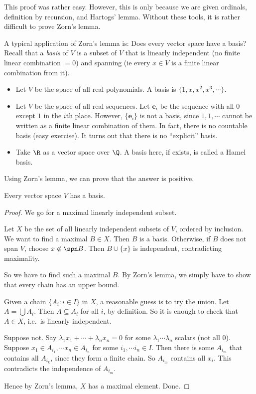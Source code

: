 \documentclass[a4paper]{article}
\begin{document}
This proof was rather easy. However, this is only because we are given ordinals, definition by recursion, and Hartogs' lemma. Without these tools, it is rather difficult to prove Zorn's lemma.

A typical application of Zorn's lemma is: Does every vector space have a basis? Recall that a \emph{basis} of $V$ is a subset of $V$ that is linearly independent (no finite linear combination $= 0$) and spanning (ie every $x\in V$ is a finite linear combination from it).

\begin{eg}\leavevmode
  \begin{itemize}
    \item Let $V$ be the space of all real polynomials. A basis is $\{1, x, x^2, x^3, \cdots\}$.
    \item Let $V$ be the space of all real sequences. Let $\mathbf{e}_i$ be the sequence with all $0$ except $1$ in the $i$th place. However, $\{\mathbf{e}_i\}$ is not a basis, since $1, 1, \cdots$ cannot be written as a finite linear combination of them. In fact, there is no countable basis (easy exercise). It turns out that there is no ``explicit'' basis.
    \item Take $\R$ as a vector space over $\Q$. A basis here, if exists, is called a Hamel basis.
  \end{itemize}
\end{eg}

Using Zorn's lemma, we can prove that the answer is positive.
\begin{thm}
  Every vector space $V$ has a basis.
\end{thm}

\begin{proof}
  We go for a maximal linearly independent subset.

  Let $X$ be the set of all linearly independent subsets of $V$, ordered by inclusion. We want to find a maximal $B\in X$. Then $B$ is a basis. Otherwise, if $B$ does not span $V$, choose $x\not\in \spn B$. Then $B\cup \{x\}$ is independent, contradicting maximality.

  So we have to find such a maximal $B$. By Zorn's lemma, we simply have to show that every chain has an upper bound.

  Given a chain $\{A_i: i\in I\}$ in $X$, a reasonable guess is to try the union. Let $A = \bigcup A_i$. Then $A\subseteq A_i$ for all $i$, by definition. So it is enough to check that $A\in X$, i.e.\ is linearly independent.

  Suppose not. Say $\lambda_1x_1 + \cdots + \lambda_nx_n = 0$ for some $\lambda_1 \cdots \lambda_n$ scalars (not all $0$). Suppose $x_1 \in A_{i_1}, \cdots x_n \in A_{i_n}$ for some $i_1, \cdots i_n \in I$. Then there is some $A_{i_m}$ that contains all $A_{i_k}$, since they form a finite chain. So $A_{i_m}$ contains all $x_i$. This contradicts the independence of $A_{i_m}$.

  Hence by Zorn's lemma, $X$ has a maximal element. Done.
\end{proof}
\end{document}
